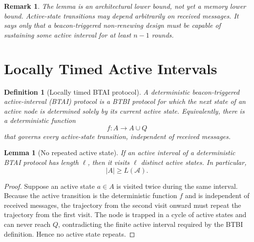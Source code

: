\documentclass[11pt]{article}
\newtheorem{definition}{Definition}
\newtheorem{lemma}{Lemma}
\newtheorem{remark}{Remark}
\begin{document}
\begin{remark}
The lemma is an architectural lower bound, not yet a memory lower bound. Active-state transitions may depend arbitrarily on received messages. It says only that a beacon-triggered non-renewing design must be capable of sustaining some active interval for at least $n-1$ rounds.
\end{remark}

\section{Locally Timed Active Intervals}
\begin{definition}[Locally timed BTAI protocol]
A deterministic beacon-triggered active-interval (BTAI) protocol is a BTBI protocol for which the next state of an active node is determined solely by its current active state. Equivalently, there is a deterministic function
\[
f:A\to A\cup Q
\]
that governs every active-state transition, independent of received messages.
\end{definition}

\begin{lemma}[No repeated active state]
If an active interval of a deterministic BTAI protocol has length $\ell$, then it visits $\ell$ distinct active states. In particular,
\[
|A|\ge L(\mathcal A).
\]
\end{lemma}
\begin{proof}
Suppose an active state $a\in A$ is visited twice during the same interval. Because the active transition is the deterministic function $f$ and is independent of received messages, the trajectory from the second visit onward must repeat the trajectory from the first visit. The node is trapped in a cycle of active states and can never reach $Q$, contradicting the finite active interval required by the BTBI definition. Hence no active state repeats.
\end{proof}
\end{document}
